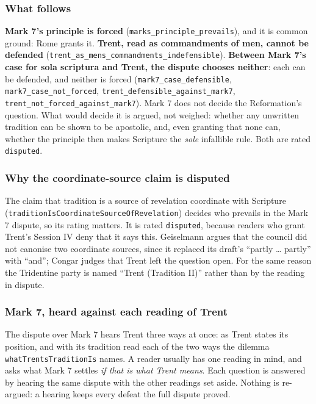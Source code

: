 \documentclass[11pt]{article}
\begin{document}
\subsubsection*{What follows}
\textbf{Mark 7’s principle is forced} (\texttt{marks\_\allowbreak{}principle\_\allowbreak{}prevails}), and it is common ground: Rome grants it. \textbf{Trent, read as commandments of men, cannot be defended} (\texttt{trent\_\allowbreak{}as\_\allowbreak{}mens\_\allowbreak{}commandments\_\allowbreak{}indefensible}). \textbf{Between Mark 7’s case for sola scriptura and Trent, the dispute chooses neither}: each can be defended, and neither is forced (\texttt{mark7\_\allowbreak{}case\_\allowbreak{}defensible}, \texttt{mark7\_\allowbreak{}case\_\allowbreak{}not\_\allowbreak{}forced}, \texttt{trent\_\allowbreak{}defensible\_\allowbreak{}against\_\allowbreak{}mark7}, \texttt{trent\_\allowbreak{}not\_\allowbreak{}forced\_\allowbreak{}against\_\allowbreak{}mark7}). Mark 7 does not decide the Reformation’s question. What would decide it is argued, not weighed: whether any unwritten tradition can be shown to be apostolic, and, even granting that none can, whether the principle then makes Scripture the \emph{sole} infallible rule. Both are rated \texttt{disputed}.

\subsubsection*{Why the coordinate-source claim is disputed}
The claim that tradition is a source of revelation coordinate with Scripture (\texttt{tradition\allowbreak{}Is\allowbreak{}Coordinate\allowbreak{}Source\allowbreak{}Of\allowbreak{}Revelation}) decides who prevails in the Mark 7 dispute, so its rating matters. It is rated \texttt{disputed}, because readers who grant Trent’s Session IV deny that it says this. Geiselmann argues that the council did not canonise two coordinate sources, since it replaced its draft’s “partly … partly” with “and”; Congar judges that Trent left the question open. For the same reason the Tridentine party is named “Trent (Tradition II)” rather than by the reading in dispute.

\subsubsection*{Mark 7, heard against each reading of Trent}
The dispute over Mark 7 hears Trent three ways at once: as Trent states its position, and with its tradition read each of the two ways the dilemma \texttt{what\allowbreak{}Trents\allowbreak{}Tradition\allowbreak{}Is} names. A reader usually has one reading in mind, and asks what Mark 7 settles \emph{if that is what Trent means}. Each question is answered by hearing the same dispute with the other readings set aside. Nothing is re-argued: a hearing keeps every defeat the full dispute proved.
\end{document}

